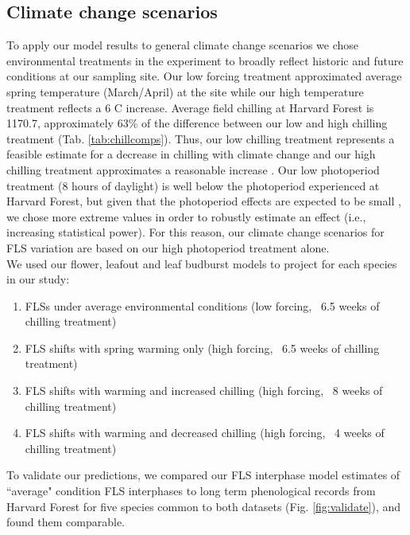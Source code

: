 \documentclass[12pt]{article}\usepackage[]{graphicx}\usepackage[]{color}
\begin{document}
\subsection*{Climate change scenarios}
\noindent To apply our model results to general climate change scenarios we chose environmental treatments in the experiment to broadly reflect historic and future conditions at our sampling site. Our low forcing treatment approximated average spring temperature (March/April) at the site while our high temperature treatment reflects a 6 \degree C increase. Average field chilling \citep[calculated from 15 October - 15 April, measured in Chill Hours,][]{Weinberger:1950aa} at Harvard Forest is 1170.7, approximately  63\% of the difference between our low and high chilling treatment (Tab. \ref{tab:chillcomps}). Thus, our low chilling treatment represents a feasible estimate for a decrease in chilling with climate change and our high chilling treatment approximates a reasonable increase \citep{Luedeling:2012aa}. Our low photoperiod treatment (8 hours of daylight) is well below the photoperiod experienced at Harvard Forest, but given that the photoperiod effects are expected to be small \citep{Laube:2014a}, we chose more extreme values in order to robustly estimate an effect (i.e., increasing statistical power). For this reason, our climate change scenarios for FLS variation are based on our high photoperiod treatment alone.\\


\noindent We used our flower, leafout and leaf budburst models to project for each species in our study:
\begin{enumerate}
\item FLSs under average environmental conditions  (low forcing, ~6.5 weeks of chilling treatment)
\item FLS shifts with spring warming only (high forcing, ~6.5 weeks of chilling treatment)
\item FLS shifts with warming and increased chilling (high forcing, ~8 weeks of chilling treatment)
\item FLS shifts with warming and decreased chilling (high forcing, ~4 weeks of chilling treatment)
\end{enumerate}

\noindent To validate our predictions, we compared our FLS interphase model estimates of ``average" condition FLS interphases to long term phenological records from Harvard Forest \citep{OKeefe2015} for five species common to both datasets (Fig. \ref{fig:validate}), and found them comparable. \\
\end{document}
